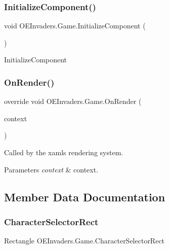 \subsubsection{\texorpdfstring{InitializeComponent()}{InitializeComponent()}\hspace{0.1cm}{\footnotesize\ttfamily [2/2]}}
{\footnotesize\ttfamily void O\+E\+Invaders.\+Game.\+Initialize\+Component (\begin{DoxyParamCaption}{ }\end{DoxyParamCaption})}



Initialize\+Component 

\mbox{\label{class_o_e_invaders_1_1_game_a67abbd985ea58a580e35f159471dd26f}} 
\subsubsection{\texorpdfstring{OnRender()}{OnRender()}}
{\footnotesize\ttfamily override void O\+E\+Invaders.\+Game.\+On\+Render (\begin{DoxyParamCaption}\item[{Drawing\+Context}]{context }\end{DoxyParamCaption})\hspace{0.3cm}{\ttfamily [protected]}}



Called by the xaml\textquotesingle{}s rendering system. 


\begin{DoxyParams}{Parameters}
{\em context} & context.\\
\hline
\end{DoxyParams}


\subsection{Member Data Documentation}
\mbox{\label{class_o_e_invaders_1_1_game_aa676962570ed4ef970cea41b08ca74ba}} 
\subsubsection{\texorpdfstring{CharacterSelectorRect}{CharacterSelectorRect}}
{\footnotesize\ttfamily Rectangle O\+E\+Invaders.\+Game.\+Character\+Selector\+Rect}



